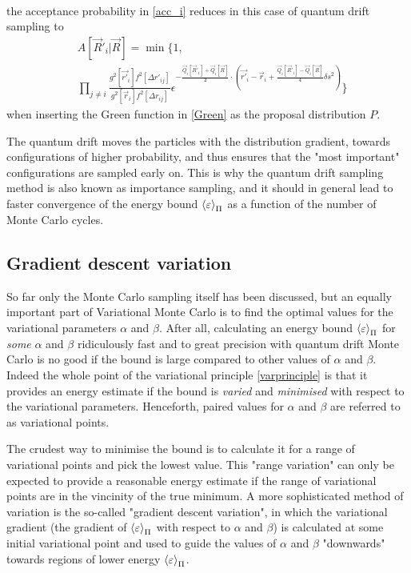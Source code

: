 \documentclass[a4paper,8pt]{article}
\begin{document}
\begin{multicols}{2}
\begin{align}
\end{align}
the acceptance probability in \eqref{acc_i} reduces in this case of quantum drift sampling to
\begin{align}
&A[\vec{R}'_i|\vec{R}] = \min\Bigg\{1, \nonumber\\
&\prod\limits_{j \neq i} \frac{g^2[\vec{r'}_i]f^2[\Delta r'_{ij}]}{g^2[\vec{r}_i]f^2[\Delta r_{ij}]}\epsilon^{-\frac{\vec{Q}_i[\vec{R}'_i]+\vec{Q}_i[\vec{R}]}{2}\cdot\left(\vec{r'}_i-\vec{r}_i+\frac{\vec{Q}_i[\vec{R}'_i]-\vec{Q}_i[\vec{R}]}{4}\delta s^2\right)}\Bigg\} \label{accLD}
\end{align}
when inserting the Green function in \eqref{Green} as the proposal distribution $P$.

The quantum drift moves the particles with the distribution gradient, towards configurations of higher probability, and thus ensures that the "most important" configurations are sampled early on. This is why the quantum drift sampling method is also known as importance sampling, and it should in general lead to faster convergence of the energy bound $\ev{\varepsilon}_\Pi$ as a function of the number of Monte Carlo cycles.

\subsection{Gradient descent variation} \label{gradientdescent}
So far only the Monte Carlo sampling itself has been discussed, but an equally important part of Variational Monte Carlo is to find the optimal values for the variational parameters $\alpha$ and $\beta$. After all, calculating an energy bound $\ev{\varepsilon}_\Pi$ for \textit{some} $\alpha$ and $\beta$ ridiculously fast and to great precision with quantum drift Monte Carlo is no good if the bound is large compared to other values of $\alpha$ and $\beta$. Indeed the whole point of the variational principle \eqref{varprinciple} is that it provides an energy estimate if the bound is \textit{varied} and \textit{minimised} with respect to the variational parameters. Henceforth, paired values for $\alpha$ and $\beta$ are referred to as variational points.

The crudest way to minimise the bound is to calculate it for a range of variational points and pick the lowest value. This "range variation" can only be expected to provide a reasonable energy estimate if the range of variational points are in the vincinity of the true minimum. A more sophisticated method of variation is the so-called "gradient descent variation", in which the variational gradient (the gradient of $\ev{\varepsilon}_\Pi$ with respect to $\alpha$ and $\beta$) is calculated at some initial variational point and used to guide the values of $\alpha$ and $\beta$ "downwards" towards regions of lower energy $\ev{\varepsilon}_\Pi$.


\end{multicols}
\end{document}
